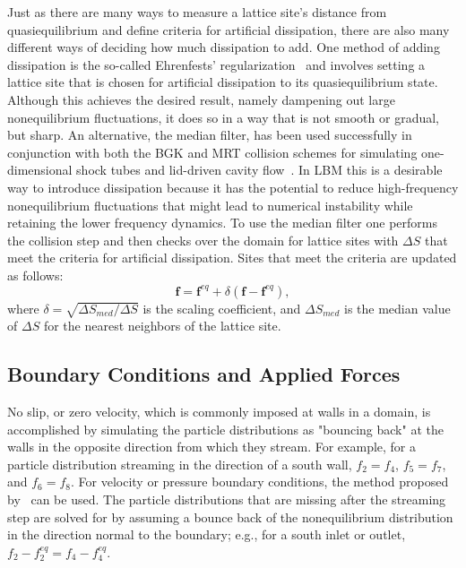 Just as there are many ways to measure a lattice site's distance from quasiequilibrium and define criteria for artificial dissipation, there are also many different ways of deciding how much dissipation to add.
One method of adding dissipation is the so-called Ehrenfests' regularization~\cite{brownlee2006stabilization} and involves setting a lattice site that is chosen for artificial dissipation to its quasiequilibrium state.
Although this achieves the desired result, namely dampening out large nonequilibrium fluctuations, it does so in a way that is not smooth or gradual, but sharp.
An alternative, the median filter, has been used successfully in conjunction with both the BGK and MRT collision schemes for simulating one-dimensional shock tubes and lid-driven cavity flow~\cite{brownlee2008nonequilibrium,gorban2014enhancement,packwood2009entropy}.
In LBM this is a desirable way to introduce dissipation because it has the potential to reduce high-frequency nonequilibrium fluctuations that might lead to numerical instability while retaining the lower frequency dynamics.
To use the median filter one performs the collision step and then checks over the domain for lattice sites with $\Delta S$ that meet the criteria for artificial dissipation.
Sites that meet the criteria are updated as follows:
\begin{equation} \label{eq:median-filter}
\mathbf{f} = \mathbf{f}^{eq} + \delta (\mathbf{f} - \mathbf{f}^{eq}),
\end{equation}
\noindent where $\delta = \sqrt{\Delta S_{med} / \Delta S}$ is the scaling coefficient, and $\Delta S_{med}$ is the median value of $\Delta S$ for the nearest neighbors of the lattice site.

\subsection{Boundary Conditions and Applied Forces} \label{sec:bcs}

No slip, or zero velocity, which is commonly imposed at walls in a domain, is accomplished by simulating the particle distributions as "bouncing back" at the walls in the opposite direction from which they stream.
For example, for a particle distribution streaming in the direction of a south wall, $f_2 = f_4$, $f_5 = f_7$, and $f_6 = f_8$.
For velocity or pressure boundary conditions, the method proposed by~\citet{zou1997pressure} can be used.
The particle distributions that are missing after the streaming step are solved for by assuming a bounce back of the nonequilibrium distribution in the direction normal to the boundary; e.g., for a south inlet or outlet, $f_2 - f_2^{eq} = f_4 - f_4^{eq}$.

